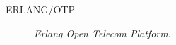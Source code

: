 \chapter*{\nomeglosarioacronimos}
\label{chap:acronimos}


\begin{description}
 \item [ERLANG/OTP] \emph{Erlang Open Telecom Platform}.
\end{description}

